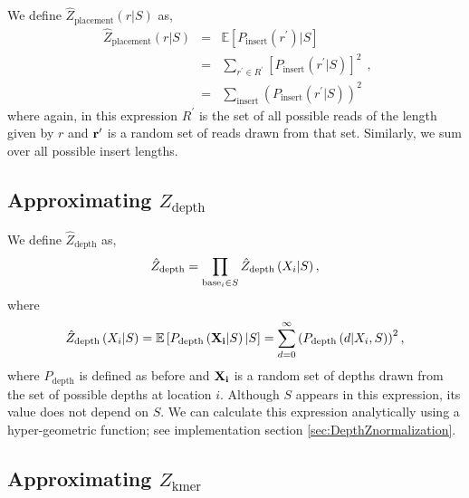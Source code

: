 \documentclass[phd,tocprelim]{cornell}
\begin{document}
We define $\hat{Z}_{\text{placement}}(r|S)$ as,
\begin{equation}
    \begin{array}{lcl}
        \hat{Z}_{\text{placement}}(r|S) & = & \mathbb{E}\left[P_{\text{insert}}\left(r^{\prime}\right)|S\right] \\
        & = & \sum_{r^{\prime} \in R^{\prime}} \left[ P_{\text{insert}}(r^{\prime}|S)\right]^{2} \\
        & = & \sum_{\text{insert}} \left(P_{\text{insert}}(r^{\prime}|S)\right)^{2}
    \end{array},
\end{equation}
where again, in this expression $R^{\prime}$ is the set of all possible reads of the length given by $r$ and ${\bf r^{\prime}}$ is a random set of reads drawn from that set. Similarly, we sum over all possible insert lengths.


\subsection{Approximating $Z_{\text{depth}}$} %
\label{sub:Aprroximating Z_depth}

We define $\hat{Z}_{\text{depth}}$ as,
\begin{equation}
    \hat{Z}_{\text{depth}} = \prod_{{\rm base}_{i} \in S} \hat{Z}_{\text{depth}} \left(X_{i}|S\right),
\end{equation}
where
\begin{equation}
    \hat{Z}_{\text{depth}} \left(X_{i}|S\right) = \mathbb{E}\left[P_{\text{depth}} \left({\bf X_{i}}|S\right)|S\right] = \sum_{d=0}^{\infty} \left(P_{\text{depth}}\left(d | X_{i}, S\right)\right)^{2},
\end{equation}
where $P_{\text{depth}}$ is defined as before and ${\bf X_{i}}$ is a random set of depths drawn from the set of possible depths at location $i$. Although $S$ appears in this expression, its value does not depend on $S$. We can calculate this expression analytically using a hyper-geometric function; see implementation section \ref{sec:DepthZnormalization}.


\subsection{Approximating $Z_{\text{kmer}}$} %
\label{sub:Aprroximating Z_kmer}
\end{document}
